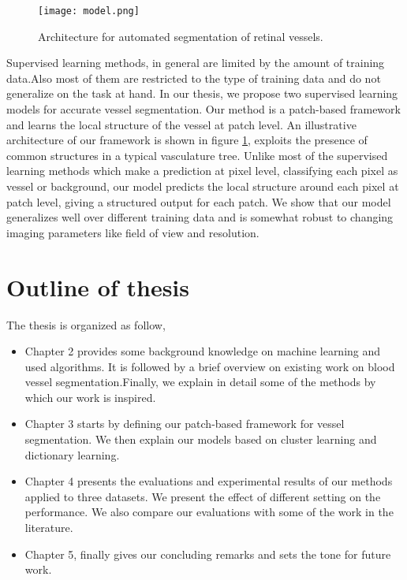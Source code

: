 \begin{figure}
	\centering	
	\texttt{[image: model.png]}
	\caption{Architecture for automated segmentation of retinal vessels.}
	\label{fig:basicmodel}		
\end{figure}
Supervised learning methods, in general are limited by the amount of training data.Also most of them are restricted to the type of training data and do not generalize on the task at hand. In our thesis, we propose two supervised learning models for accurate vessel segmentation. Our method is a patch-based framework and learns the local structure of the vessel at patch level. An illustrative architecture of our framework is shown in figure \ref{fig:basicmodel}, exploits the presence of common structures in a typical vasculature tree. Unlike most of the supervised learning methods which make a prediction at pixel level, classifying each pixel as vessel or background, our model predicts the local structure around each pixel at patch level, giving a structured output for each patch. We show that our model generalizes well over different training data and is somewhat robust to changing imaging parameters like field of view and resolution.

\section{Outline of thesis}
The thesis is organized as follow,
\begin{itemize}
	\item Chapter 2 provides some background knowledge on machine learning and used algorithms. It is followed by a brief overview on existing work on blood vessel segmentation.Finally, we explain in detail some of the methods by which our work is inspired.
	\item Chapter 3 starts by defining our patch-based framework for vessel segmentation. We then explain our models based on cluster learning and dictionary learning.
	\item Chapter 4 presents the evaluations and experimental results of our methods applied to three datasets. We present the effect of different setting on the performance. We also compare our evaluations with some of the work in the literature.
	\item Chapter 5, finally gives our concluding remarks and sets the tone for future work.
\end{itemize}